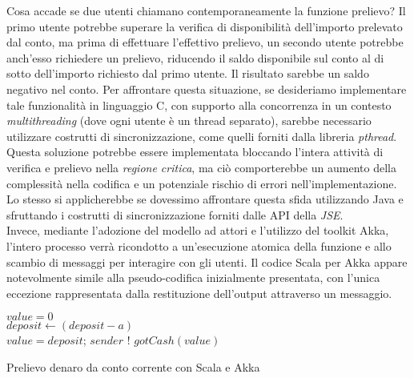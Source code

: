 Cosa accade se due utenti chiamano contemporaneamente la funzione prelievo? Il primo utente potrebbe superare la verifica di disponibilità dell'importo prelevato dal conto, ma prima di effettuare l'effettivo prelievo, un secondo utente potrebbe anch'esso richiedere un prelievo, riducendo il saldo disponibile sul conto al di sotto dell'importo richiesto dal primo utente. 
Il risultato sarebbe un saldo negativo nel conto. 
Per affrontare questa situazione, se desideriamo implementare tale funzionalità in linguaggio C, con supporto alla concorrenza in un contesto \textit{multithreading} (dove ogni utente è un thread separato), sarebbe necessario utilizzare costrutti di sincronizzazione, come quelli forniti dalla libreria \textit{pthread}. \\
Questa soluzione potrebbe essere implementata bloccando l'intera attività di verifica e prelievo nella \textit{regione critica}, ma ciò comporterebbe un aumento della complessità nella codifica e un potenziale rischio di errori nell'implementazione.
Lo stesso si applicherebbe se dovessimo affrontare questa sfida utilizzando Java e sfruttando i costrutti di sincronizzazione forniti dalle API della \textit{JSE}. \\
Invece, mediante l'adozione del modello ad attori e l'utilizzo del toolkit Akka, l'intero processo verrà ricondotto a un'esecuzione atomica della funzione e allo scambio di messaggi per interagire con gli utenti. 
Il codice Scala per Akka appare notevolmente simile alla pseudo-codifica inizialmente presentata, con l'unica eccezione rappresentata dalla restituzione dell'output attraverso un messaggio.

\begin{algorithm}[H]

    $value = 0$ \\
      {
        $deposit \leftarrow (deposit - a)$ \\
        $value = deposit$;
      }
      $sender$ $!$ $gotCash(value)$
    \caption{Prelievo denaro da conto corrente con Scala e Akka}
\end{algorithm}

